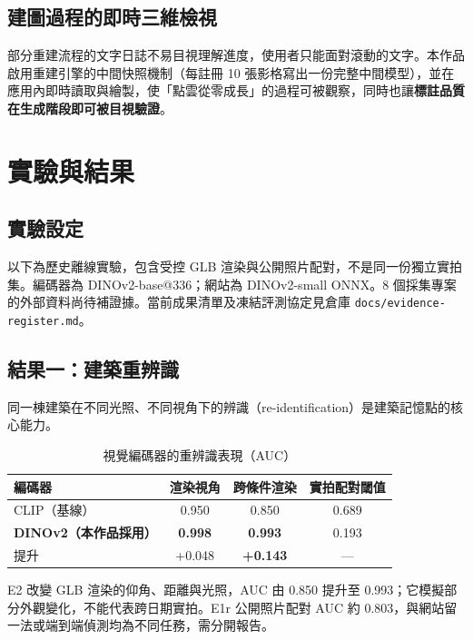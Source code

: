\documentclass[11pt,a4paper,fontset=windows]{ctexart}
\newcommand{\hl}[1]{\textbf{\color{gold}#1}}
\begin{document}
\subsection{建圖過程的即時三維檢視}

部分重建流程的文字日誌不易目視理解進度，使用者只能面對滾動的文字。本作品啟用重建引擎的中間快照機制（每註冊 10 張影格寫出一份完整中間模型），並在應用內即時讀取與繪製，使「點雲從零成長」的過程可被觀察，同時也讓\textbf{標註品質在生成階段即可被目視驗證}。

\section{實驗與結果}

\subsection{實驗設定}

以下為歷史離線實驗，包含受控 GLB 渲染與公開照片配對，不是同一份獨立實拍集。編碼器為 DINOv2-base@336；網站為 DINOv2-small ONNX。8 個採集專案的外部資料尚待補證據。當前成果清單及凍結評測協定見倉庫 \texttt{docs/evidence-register.md}。

\subsection{結果一：建築重辨識}

同一棟建築在不同光照、不同視角下的辨識（re-identification）是建築記憶點的核心能力。

\begin{table}[H]
\centering
\small
\caption{視覺編碼器的重辨識表現（AUC）}
\begin{tabular}{lccc}
\toprule
\textbf{編碼器} & \textbf{渲染視角} & \textbf{跨條件渲染} & \textbf{實拍配對閾值} \\
\midrule
CLIP（基線） & 0.950 & 0.850 & 0.689 \\
\textbf{DINOv2（本作品採用）} & \hl{0.998} & \hl{0.993} & 0.193 \\
\midrule
提升 & +0.048 & \hl{+0.143} & — \\
\bottomrule
\end{tabular}
\end{table}

E2 改變 GLB 渲染的仰角、距離與光照，AUC 由 0.850 提升至 0.993；它模擬部分外觀變化，不能代表跨日期實拍。E1r 公開照片配對 AUC 約 0.803，與網站留一法或端到端偵測均為不同任務，需分開報告。
\end{document}
